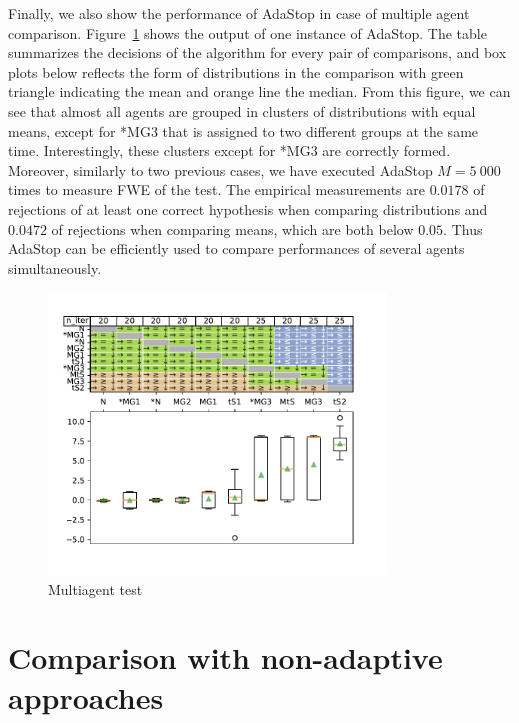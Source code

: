 \documentclass{article}
\theoremstyle{plain}
\theoremstyle{remark}
\newcommand{\1}{\mathbbm{1}}
\numberwithin{equation}{section}
\begin{document}
 Finally, we also show the performance of AdaStop in case of multiple agent comparison. Figure~\ref{fig.exp3} shows the output of one instance of AdaStop. The table summarizes the decisions of the algorithm for every pair of comparisons, and box plots below reflects the form of distributions in the comparison with green triangle indicating the mean and orange line the median. From this figure, we can see that almost all agents are grouped in clusters of distributions with equal means, except for *MG3 that is assigned to two different groups at the same time. Interestingly, these clusters except for *MG3 are correctly formed. Moreover, similarly to two previous cases, we have executed AdaStop $M=5 \ 000$ times to measure FWE of the test. The empirical measurements are $0.0178$ of rejections of at least one correct hypothesis when comparing distributions and $0.0472$ of rejections when comparing means, which are both below $0.05$. Thus AdaStop can be efficiently used to compare performances of several agents simultaneously.





\begin{figure}[h]
  \begin{center}
    \includegraphics[width=0.8\textwidth]{fig/multiagent_test.pdf}
    \caption{Multiagent test}
    \label{fig.exp3}
  \end{center}
\end{figure}



\section{Comparison with non-adaptive approaches}
\end{document}
